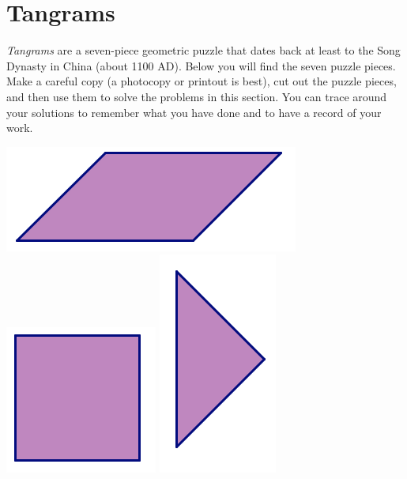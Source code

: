 \documentclass[12pt, reqno]{amsart}
\theoremstyle{remark}
\theoremstyle{definition}
\numberwithin{equation}{section}  %
\begin{document}
\bigskip
\bigskip

\newpage

\section{Tangrams}

\emph{Tangrams} are a seven-piece geometric puzzle that dates back at least to the Song Dynasty in China (about 1100 AD).  Below you will find the seven puzzle pieces.  Make a careful copy (a photocopy or printout is best), cut out the puzzle pieces, and then use them to solve the problems in this section.  You can trace around your solutions to remember what you have done and to have a record of your work.

\begin{center}
\includegraphics[scale = .470]{parallelogram}
\hfill
\includegraphics[scale = .470]{square}
\hfill
\includegraphics[scale = .470]{smtri}

\bigskip
\bigskip
\bigskip



\end{center}
\end{document}
